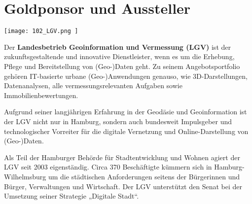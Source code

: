 \section*{Goldponsor und Aussteller}
\begin{flushright}
\texttt{[image: 102\_LGV.png ]}
\end{flushright}
\noindent
Der {\bfseries Landesbetrieb Geoinformation und Vermessung (LGV)} ist der zukunftsgestaltende und innovative Dienstleister, wenn es um die Erhebung, Pflege und Bereitstellung von (Geo-)Daten geht. Zu seinem Angebotsportfolio gehören IT-basierte urbane (Geo-)Anwendungen genauso, wie 3D-Darstellungen, Datenanalysen, alle vermessungsrelevanten Aufgaben sowie Immobilienbewertungen.

\noindent
Aufgrund seiner langjährigen Erfahrung in der Geodäsie und Geoinformation ist der LGV nicht nur in Hamburg, sondern auch bundesweit Impulsgeber und technologischer Vorreiter für die digitale Vernetzung und Online-Darstellung von (Geo-)Daten.

\noindent
Als Teil der Hamburger Behörde für Stadtentwicklung und Wohnen agiert der LGV seit 2003 eigenständig. Circa 370 Beschäftigte kümmern sich in Hamburg-Wilhelmsburg um die städtischen Anforderungen seitens der Bürgerinnen und Bürger, Verwaltungen und Wirtschaft. Der LGV unterstützt den Senat bei der Umsetzung seiner Strategie „Digitale Stadt“.

